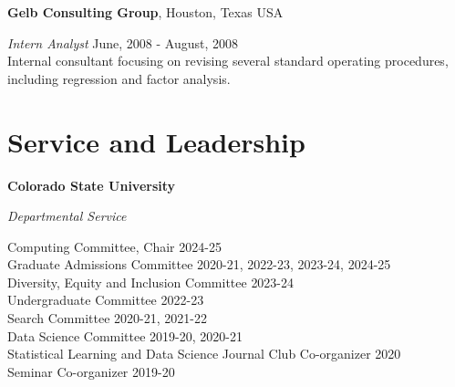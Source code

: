 \documentclass[margin,line]{res}
\begin{document}
\begin{resume}
{\bf Gelb Consulting Group}, Houston, Texas USA

\vspace{-.3cm}
{\em Intern Analyst} \hfill {June, 2008 - August, 2008}\\
Internal consultant focusing on revising several standard operating procedures, including regression and factor analysis. 

\section{\sc Service and Leadership}

{\bf Colorado State University}

\vspace{-.3cm}
{\em Departmental Service}

\vspace{-.3cm}
Computing Committee, Chair \hfill {2024-25} \\
Graduate Admissions Committee \hfill {2020-21, 2022-23, 2023-24, 2024-25} \\
Diversity, Equity and Inclusion Committee \hfill {2023-24} \\
Undergraduate Committee \hfill {2022-23} \\
Search Committee \hfill {2020-21, 2021-22} \\
Data Science Committee \hfill {2019-20, 2020-21} \\
Statistical Learning and Data Science Journal Club Co-organizer \hfill {2020} \\
Seminar Co-organizer \hfill {2019-20} \\


\end{resume}
\end{document}
